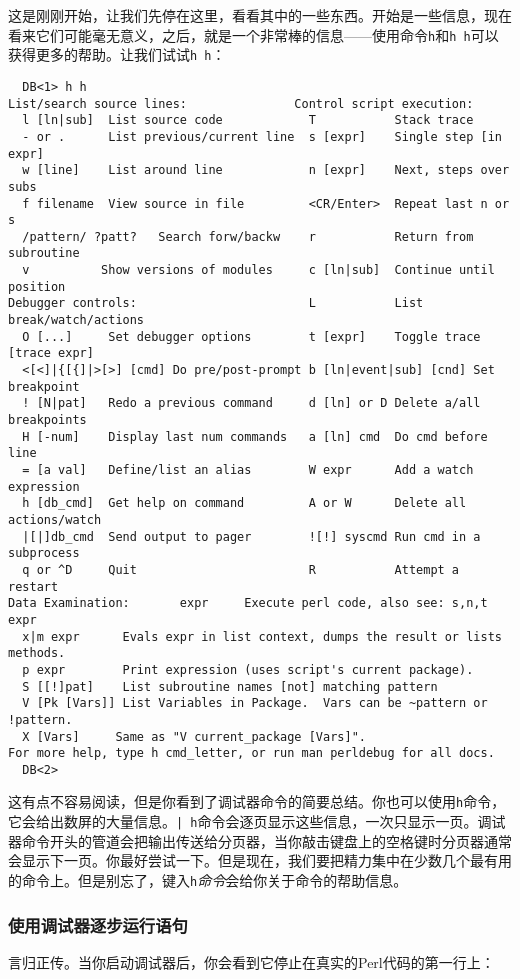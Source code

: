 这是刚刚开始，让我们先停在这里，看看其中的一些东西。开始是一些信息，现在看来它们可能毫无意义，之后，就是一个非常棒的信息——使用命令\verb|h|和\verb|h h|可以获得更多的帮助。让我们试试\verb|h h|：

\begin{lstlisting}
  DB<1> h h
List/search source lines:               Control script execution:
  l [ln|sub]  List source code            T           Stack trace
  - or .      List previous/current line  s [expr]    Single step [in expr]
  w [line]    List around line            n [expr]    Next, steps over subs
  f filename  View source in file         <CR/Enter>  Repeat last n or s
  /pattern/ ?patt?   Search forw/backw    r           Return from subroutine
  v          Show versions of modules     c [ln|sub]  Continue until position
Debugger controls:                        L           List break/watch/actions
  O [...]     Set debugger options        t [expr]    Toggle trace [trace expr]
  <[<]|{[{]|>[>] [cmd] Do pre/post-prompt b [ln|event|sub] [cnd] Set breakpoint
  ! [N|pat]   Redo a previous command     d [ln] or D Delete a/all breakpoints
  H [-num]    Display last num commands   a [ln] cmd  Do cmd before line
  = [a val]   Define/list an alias        W expr      Add a watch expression
  h [db_cmd]  Get help on command         A or W      Delete all actions/watch
  |[|]db_cmd  Send output to pager        ![!] syscmd Run cmd in a subprocess
  q or ^D     Quit                        R           Attempt a restart
Data Examination:       expr     Execute perl code, also see: s,n,t expr
  x|m expr      Evals expr in list context, dumps the result or lists methods.
  p expr        Print expression (uses script's current package).
  S [[!]pat]    List subroutine names [not] matching pattern
  V [Pk [Vars]] List Variables in Package.  Vars can be ~pattern or !pattern.
  X [Vars]     Same as "V current_package [Vars]".
For more help, type h cmd_letter, or run man perldebug for all docs.
  DB<2> 
\end{lstlisting}

这有点不容易阅读，但是你看到了调试器命令的简要总结。你也可以使用\verb|h|命令，它会给出数屏的大量信息。\verb=| h=命令会逐页显示这些信息，一次只显示一页。调试器命令开头的管道会把输出传送给分页器，当你敲击键盘上的空格键时分页器通常会显示下一页。你最好尝试一下。但是现在，我们要把精力集中在少数几个最有用的命令上。但是别忘了，键入\verb|h|\textit{命令}会给你关于命令的帮助信息。

\subsubsection{使用调试器逐步运行语句}
言归正传。当你启动调试器后，你会看到它停止在真实的Perl代码的第一行上：

